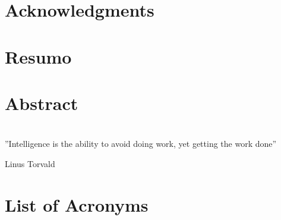 \documentclass[a4paper, 11pt, openany]{book}
\begin{document}
\frontmatter

\newpage\thispagestyle{empty}

\pagestyle{plain}



\chapter*{Acknowledgments}


\chapter*{Resumo}


\chapter*{Abstract}


\chapter*{}
\setlength\epigraphwidth{12cm}
\setlength\epigraphrule{0pt}
\makeatletter
{}
\makeatother
\vspace*{\fill}
\epigraph{''Intelligence is the ability to avoid doing work, yet getting the work done''}
{Linus Torvald}
\vspace*{\fill}

\pagestyle{plain}
\tableofcontents

\chapter*{List of Acronyms}


\listoffigures

\listoftables

\mainmatter
\end{document}
